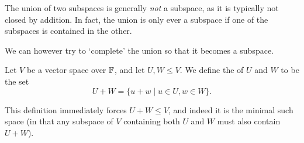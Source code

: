 \documentclass[a4paper]{scrartcl}
\begin{document}
The union of two subspaces is generally \emph{not} a subspace, as it is typically not closed by addition. In fact, the union is only ever a subspace if one of the subspaces is contained in the other. 

We can however try to `complete' the union so that it becomes a subspace.

\begin{definition}
    Let $V$ be a vector space over $\mathbb{F}$, and let $U, W \leq V$. We define the  of $U$ and $W$ to be the set
    $$
    U + W = \{u + w \mid u \in U, w \in W \}.
    $$
\end{definition}

This definition immediately forces $U + W \leq V$, and indeed it is the minimal such space (in that any subspace of $V$ containing both $U$ and $W$ must also contain $U + W$).
\end{document}
